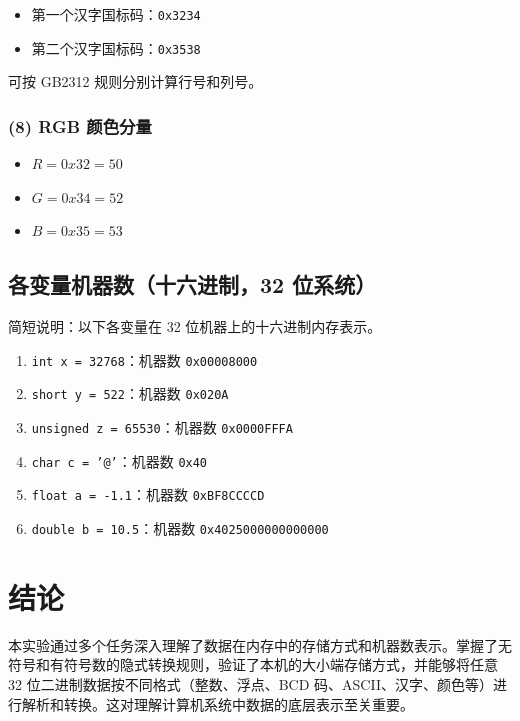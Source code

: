 \documentclass[12pt, a4paper]{academics}
\begin{document}
\begin{itemize}
    \item 第一个汉字国标码：\texttt{0x3234}
    \item 第二个汉字国标码：\texttt{0x3538}
\end{itemize}

可按 GB2312 规则分别计算行号和列号。

\subsubsection{(8) RGB 颜色分量}

\begin{itemize}
    \item $R = 0x32 = 50$
    \item $G = 0x34 = 52$
    \item $B = 0x35 = 53$
\end{itemize}

\subsection{各变量机器数（十六进制，32 位系统）}

简短说明：以下各变量在 32 位机器上的十六进制内存表示。

\begin{enumerate}
    \item \texttt{int x = 32768}：机器数 \texttt{0x00008000}
    \item \texttt{short y = 522}：机器数 \texttt{0x020A}
    \item \texttt{unsigned z = 65530}：机器数 \texttt{0x0000FFFA}
    \item \texttt{char c = '@'}：机器数 \texttt{0x40}
    \item \texttt{float a = -1.1}：机器数 \texttt{0xBF8CCCCD}
    \item \texttt{double b = 10.5}：机器数 \texttt{0x4025000000000000}
\end{enumerate}

\section{结论}

本实验通过多个任务深入理解了数据在内存中的存储方式和机器数表示。掌握了无符号和有符号数的隐式转换规则，验证了本机的大小端存储方式，并能够将任意 32 位二进制数据按不同格式（整数、浮点、BCD 码、ASCII、汉字、颜色等）进行解析和转换。这对理解计算机系统中数据的底层表示至关重要。
\end{document}
